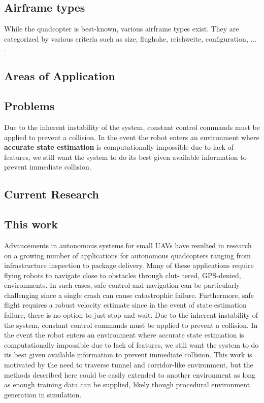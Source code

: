 \subsection{Airframe types}
While the quadcopter is best-known,
various airframe types exist. They are categorized
by various criteria such as size, flughohe, reichweite, configuration, ... .

\subsection{Areas of Application}


\subsection{Problems}
Due to the inherent instability of the system, constant control commands must be applied to
prevent a collision. In the event the robot enters an environment where \textbf{accurate state estimation}
is computationally impossible due to lack of features, we still want the system to do its best given
available information to prevent immediate collision.


\subsection{Current Research}






\subsection{This work}

Advancements in autonomous systems for small UAVs have resulted in research on a growing
number of applications for autonomous quadcopters ranging from infrastructure inspection to
package delivery.
Many of these applications require flying robots to navigate close to obstacles through clut-
tered, GPS-denied, environments. In such cases, safe control and navigation can be particularly
challenging since a single crash can cause catastrophic failure. Furthermore, safe flight requires
a robust velocity estimate since in the event of state estimation failure, there is no option to just
stop and wait.
Due to the inherent instability of the system, constant control commands must be applied to
prevent a collision. In the event the robot enters an environment where accurate state estimation
is computationally impossible due to lack of features, we still want the system to do its best given
available information to prevent immediate collision.
This work is motivated by the need to traverse tunnel and corridor-like environment, but
the methods described here could be easily extended to another environment as long as enough
training data can be supplied, likely though procedural environment generation in simulation.

